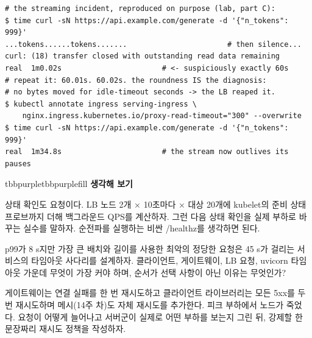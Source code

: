 \begin{terminalbox}
\begin{Verbatim}[breaklines=true,breakanywhere=true,fontsize=\small,formatcom=\color{tbbtermfg},codes=\tbbcodeactive]
# the streaming incident, reproduced on purpose (lab, part C):
$ time curl -sN https://api.example.com/generate -d '{"n_tokens": 999}'
...tokens......tokens.......                       # then silence...
curl: (18) transfer closed with outstanding read data remaining
real  1m0.02s                       # <- suspiciously exactly 60s
# repeat it: 60.01s. 60.02s. the roundness IS the diagnosis:
# no bytes moved for idle-timeout seconds -> the LB reaped it.
$ kubectl annotate ingress serving-ingress \
    nginx.ingress.kubernetes.io/proxy-read-timeout="300" --overwrite
$ time curl -sN https://api.example.com/generate -d '{"n_tokens": 999}'
real  1m34.8s                       # the stream now outlives its pauses
\end{Verbatim}
\end{terminalbox}

\begin{calloutbox}{tbbpurple}{tbbpurplefill}
{\normalsize\bfseries\color{tbbpurple}생각해 보기}\par\vspace{3pt}
\begin{tbbitemize}
  \item 상태 확인도 요청이다. LB 노드 2개 × 10초마다 × 대상 20개에 kubelet의 준비 상태 프로브까지 더해 백그라운드 QPS를 계산하자. 그런 다음 상태 확인을 실제 부하로 바꾸는 실수를 말하자. 순전파를 실행하는 비싼 /healthz를 생각하면 된다.
  \item p99가 8 s지만 가장 큰 배치와 길이를 사용한 최악의 정당한 요청은 45 s가 걸리는 서비스의 타임아웃 사다리를 설계하자. 클라이언트, 게이트웨이, LB 요청, uvicorn 타임아웃 가운데 무엇이 가장 커야 하며, 순서가 선택 사항이 아닌 이유는 무엇인가?
  \item 게이트웨이는 연결 실패를 한 번 재시도하고 클라이언트 라이브러리는 모든 5xx를 두 번 재시도하며 메시(14주 차)도 자체 재시도를 추가한다. 피크 부하에서 노드가 죽었다. 요청이 어떻게 늘어나고 서버군이 실제로 어떤 부하를 보는지 그린 뒤, 강제할 한 문장짜리 재시도 정책을 작성하자.
\end{tbbitemize}
\end{calloutbox}

